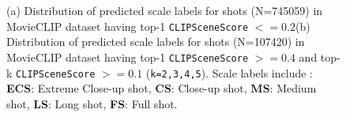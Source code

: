 \begin{figure}[h!]
\centering
{}\hfill
{}
\caption{(a) Distribution of predicted scale labels for shots (N=745059) in MovieCLIP dataset having top-1 \texttt{CLIPSceneScore} $<=0.2$(b) Distribution of predicted scale labels for shots (N=107420) in MovieCLIP dataset having top-1 \texttt{CLIPSceneScore} $>=0.4$ and top-k \texttt{CLIPSceneScore} $>=0.1$ (\texttt{k=2,3,4,5}). Scale labels include : \textbf{ECS}: Extreme Close-up shot, \textbf{CS}: Close-up shot, \textbf{MS}: Medium shot, \textbf{LS}: Long shot, \textbf{FS}: Full shot.}
\label{shot scale distribution}
\end{figure}

